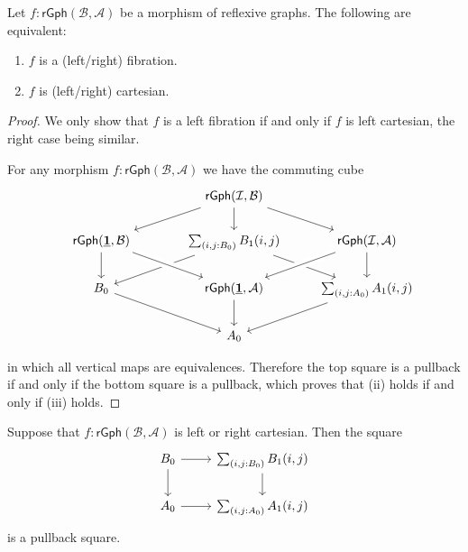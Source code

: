 \begin{prp}\label{prp:fib_cart}
Let $f:\mathsf{rGph}(\mathcal{B},\mathcal{A})$ be a morphism of reflexive graphs. The following are equivalent:
\begin{enumerate}
\item $f$ is a (left/right) fibration.
\item $f$ is (left/right) cartesian.
\end{enumerate}
\end{prp}

\begin{proof}
We only show that $f$ is a left fibration if and only if $f$ is left cartesian, the right case being similar.

For any morphism $f:\mathsf{rGph}(\mathcal{B},\mathcal{A})$ we have the commuting cube
\begin{equation*}
\begin{tikzcd}
& \mathsf{rGph}(\mathcal{I},\mathcal{B}) \arrow[dl] \arrow[d] \arrow[dr] \\
\mathsf{rGph}(\unit,\mathcal{B}) \arrow[d] & \sm{i,j:\pts{B}}\edg{B}(i,j) \arrow[dl] \arrow[dr] & \mathsf{rGph}(\mathcal{I},\mathcal{A}) \arrow[dl,crossing over] \arrow[d] \\
\pts{B} \arrow[dr] & \mathsf{rGph}(\unit,\mathcal{A}) \arrow[d] \arrow[from=ul,crossing over] & \sm{i,j:\pts{A}}\edg{A}(i,j) \arrow[dl] \\
\phantom{\sm{i,j:\pts{A}}\edg{A}(i,j)} & \pts{A}
\end{tikzcd}
\end{equation*}
in which all vertical maps are equivalences. Therefore the top square is a pullback if and only if the bottom square is a pullback, which proves that (ii) holds if and only if (iii) holds.
\end{proof}

\begin{cor}
Suppose that $f:\mathsf{rGph}(\mathcal{B},\mathcal{A})$ is left or right cartesian. Then the square
\begin{equation*}
\begin{tikzcd}
\pts{B} \arrow[r] \arrow[d] & \sm{i,j:\pts{B}}\edg{B}(i,j) \arrow[d] \\
\pts{A} \arrow[r] & \sm{i,j:\pts{A}}\edg{A}(i,j)
\end{tikzcd}
\end{equation*}
is a pullback square.
\end{cor}

